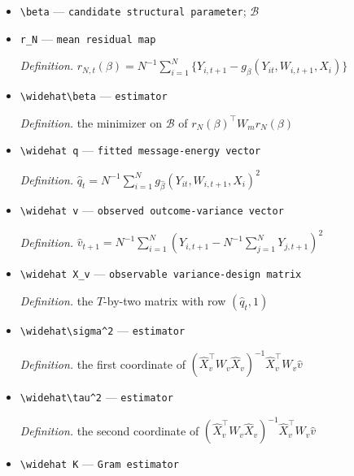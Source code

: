 \documentclass{article}
\begin{document}
\begin{itemize}
  \par\smallskip\noindent\emph{Definition.} row \(t\) equals \(\mathbb E[2U_{it}\partial_\beta g_{\beta_0}(Y_{it},W_{i,t+1},X_i)^{\top}]\)
  \item \texttt{\textbackslash{}\allowbreak{}beta} --- \texttt{candidate structural parameter}; \(\mathcal B\)
  \item \texttt{r\_\allowbreak{}N} --- \texttt{mean residual map}
  \par\smallskip\noindent\emph{Definition.} \(r_{N,t}(\beta)=N^{-1}\sum_{i=1}^N\{Y_{i,t+1}-g_\beta(Y_{it},W_{i,t+1},X_i)\}\)
  \item \texttt{\textbackslash{}\allowbreak{}widehat\textbackslash{}\allowbreak{}beta} --- \texttt{estimator}
  \par\smallskip\noindent\emph{Definition.} the minimizer on \(\mathcal B\) of \(r_N(\beta)^{\top}W_mr_N(\beta)\)
  \item \texttt{\textbackslash{}\allowbreak{}widehat q} --- \texttt{fitted message-\allowbreak{}energy vector}
  \par\smallskip\noindent\emph{Definition.} \(\widehat q_t=N^{-1}\sum_{i=1}^Ng_{\widehat\beta}(Y_{it},W_{i,t+1},X_i)^2\)
  \item \texttt{\textbackslash{}\allowbreak{}widehat v} --- \texttt{observed outcome-\allowbreak{}variance vector}
  \par\smallskip\noindent\emph{Definition.} \(\widehat v_{t+1}=N^{-1}\sum_{i=1}^N(Y_{i,t+1}-N^{-1}\sum_{j=1}^NY_{j,t+1})^2\)
  \item \texttt{\textbackslash{}\allowbreak{}widehat X\_\allowbreak{}v} --- \texttt{observable variance-\allowbreak{}design matrix}
  \par\smallskip\noindent\emph{Definition.} the \(T\)-by-two matrix with row \((\widehat q_t,1)\)
  \item \texttt{\textbackslash{}\allowbreak{}widehat\textbackslash{}\allowbreak{}sigma\textasciicircum{}2} --- \texttt{estimator}
  \par\smallskip\noindent\emph{Definition.} the first coordinate of \((\widehat X_v^{\top}W_v\widehat X_v)^{-1}\widehat X_v^{\top}W_v\widehat v\)
  \item \texttt{\textbackslash{}\allowbreak{}widehat\textbackslash{}\allowbreak{}tau\textasciicircum{}2} --- \texttt{estimator}
  \par\smallskip\noindent\emph{Definition.} the second coordinate of \((\widehat X_v^{\top}W_v\widehat X_v)^{-1}\widehat X_v^{\top}W_v\widehat v\)
  \item \texttt{\textbackslash{}\allowbreak{}widehat K} --- \texttt{Gram estimator}

\end{itemize}
\end{document}
